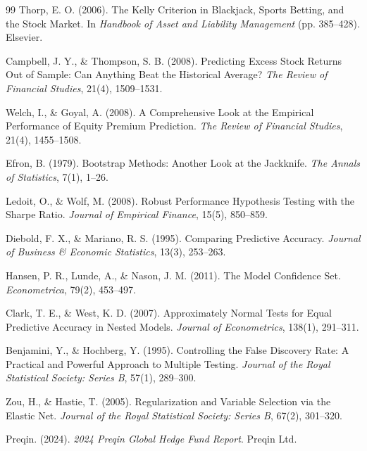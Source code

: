 \documentclass[11pt,a4paper]{article}
\begin{document}
\begin{thebibliography}{99}
Thorp, E. O. (2006).
\newblock The Kelly Criterion in Blackjack, Sports Betting, and the Stock Market.
\newblock In \textit{Handbook of Asset and Liability Management} (pp. 385--428). Elsevier.

Campbell, J. Y., \& Thompson, S. B. (2008).
\newblock Predicting Excess Stock Returns Out of Sample: Can Anything Beat the Historical Average?
\newblock \textit{The Review of Financial Studies}, 21(4), 1509--1531.

Welch, I., \& Goyal, A. (2008).
\newblock A Comprehensive Look at the Empirical Performance of Equity Premium Prediction.
\newblock \textit{The Review of Financial Studies}, 21(4), 1455--1508.


Efron, B. (1979).
\newblock Bootstrap Methods: Another Look at the Jackknife.
\newblock \textit{The Annals of Statistics}, 7(1), 1--26.

Ledoit, O., \& Wolf, M. (2008).
\newblock Robust Performance Hypothesis Testing with the Sharpe Ratio.
\newblock \textit{Journal of Empirical Finance}, 15(5), 850--859.

Diebold, F. X., \& Mariano, R. S. (1995).
\newblock Comparing Predictive Accuracy.
\newblock \textit{Journal of Business \& Economic Statistics}, 13(3), 253--263.

Hansen, P. R., Lunde, A., \& Nason, J. M. (2011).
\newblock The Model Confidence Set.
\newblock \textit{Econometrica}, 79(2), 453--497.

Clark, T. E., \& West, K. D. (2007).
\newblock Approximately Normal Tests for Equal Predictive Accuracy in Nested Models.
\newblock \textit{Journal of Econometrics}, 138(1), 291--311.

Benjamini, Y., \& Hochberg, Y. (1995).
\newblock Controlling the False Discovery Rate: A Practical and Powerful Approach to Multiple Testing.
\newblock \textit{Journal of the Royal Statistical Society: Series B}, 57(1), 289--300.

Zou, H., \& Hastie, T. (2005).
\newblock Regularization and Variable Selection via the Elastic Net.
\newblock \textit{Journal of the Royal Statistical Society: Series B}, 67(2), 301--320.

Preqin. (2024).
\newblock \textit{2024 Preqin Global Hedge Fund Report}.
\newblock Preqin Ltd.

\end{thebibliography}
\end{document}
